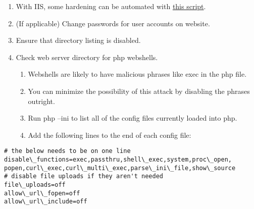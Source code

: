 \documentclass[12pt,letterpaper]{article}
\begin{document}
\begin{enumerate}
	\item With IIS, some hardening can be automated with \href{https://github.com/ufsitblue/blue/blob/main/dsu\_blue/windows/IIS.ps1}{this script}.
	\item (If applicable) Change passwords for user accounts on website.
	\item Ensure that directory listing is disabled.
	\item Check web server directory for php webshells.
	\begin{enumerate}
		\item Webshells are likely to have malicious phrases like exec in the php file.
		\item You can minimize the possibility of this attack by disabling the phrases outright.
		\item Run php --ini to list all of the config files currently loaded into php.
		\item Add the following lines to the end of each config file:
	\end{enumerate}
\end{enumerate}

{ \color{iris} \begin{verbatim}
# the below needs to be on one line
disable\_functions=exec,passthru,shell\_exec,system,proc\_open,
popen,curl\_exec,curl\_multi\_exec,parse\_ini\_file,show\_source
# disable file uploads if they aren't needed
file\_uploads=off
allow\_url\_fopen=off
allow\_url\_include=off
\end{verbatim} }
\end{document}

